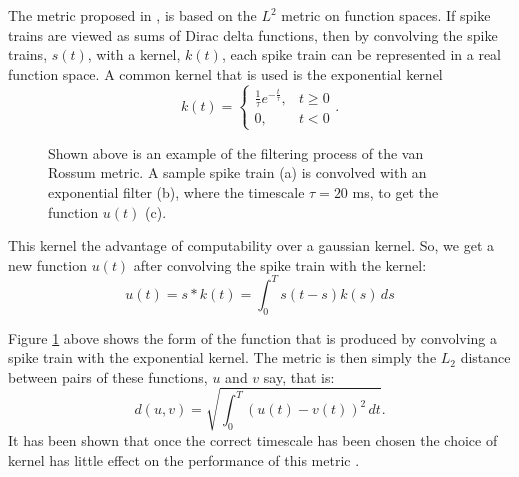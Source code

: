 The metric proposed in 
\cite{VanRossum2001a}, is based on the $L^2$ metric on function 
spaces.  If spike trains are viewed as sums of Dirac delta functions, 
then by convolving the spike trains, $s(t)$, with 
a kernel, $k(t)$, each spike train can be represented in a real function space.  A common kernel that is used is the exponential kernel
\begin{equation}
k(t) = \left\{ \begin{array}{ll}\frac{1}{\tau}e^{-\frac{t}{\tau}}, & t\geq 0 \\
0, & t<0\end{array} \right. .
\end{equation}

\begin{figure}[htb]

\caption{\label{stk} Shown above is an example of the filtering process of the van Rossum metric.  A sample spike train (a) is convolved with an exponential filter (b), where the timescale $\tau=20$ ms, to get the function $u(t)$ (c).}
\end{figure}

This kernel the advantage of computability over a 
gaussian kernel.  So, we get a new function $u(t)$ after convolving the spike 
train with the kernel:
\begin{equation}
u(t) = s*k(t) = \int_0^T s(t-s)k(s)\,ds
\end{equation}




Figure \ref{stk} above shows the form of the function that is produced by
convolving a spike train with the exponential kernel.  The metric is then simply the $L_2$ distance between pairs of these functions, $u$ and $v$ say, that is:
\begin{equation}
d(u,v) = \sqrt{\int_0^T (u(t) - v(t))^2\,dt}.
\end{equation}
It has been shown that once the correct timescale has been chosen the choice of kernel has 
little effect on the performance of this metric \cite{PaivaParkPrincipe2010}.

